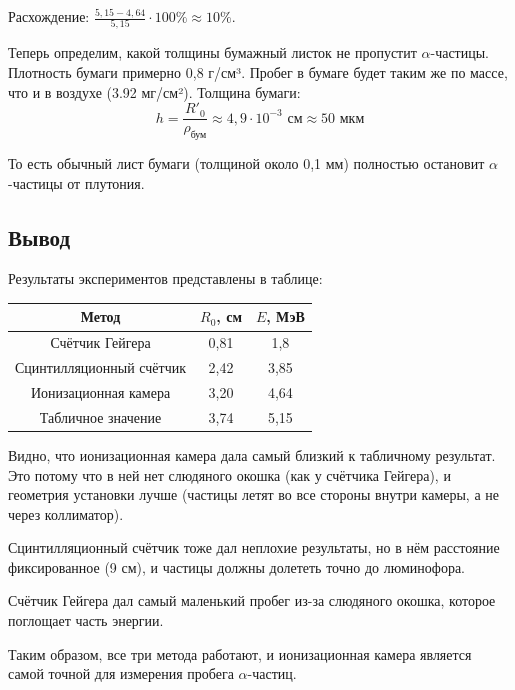 \documentclass[12pt, a4paper]{article}
\begin{document}
Расхождение: $\frac{5,15 - 4,64}{5,15} \cdot 100\% \approx 10\%$.

Теперь определим, какой толщины бумажный листок не пропустит $\alpha$-частицы. Плотность бумаги примерно 0,8 г/см³. Пробег в бумаге будет таким же по массе, что и в воздухе (3.92 мг/см²). Толщина бумаги:
\begin{equation}
    h = \frac{R'_0}{\rho_{\text{бум}}} \approx 4,9 \cdot 10^{-3} \text{ см} \approx 50 \text{ мкм}
\end{equation}

То есть обычный лист бумаги (толщиной около 0,1 мм) полностью остановит $\alpha$-частицы от плутония.

\subsection*{Вывод}

Результаты экспериментов представлены в таблице:

\begin{table}[H]
\centering
\begin{tabular}{|c|c|c|}
\hline
Метод & $R_0$, см & $E$, МэВ \\
\hline
Счётчик Гейгера & 0,81 & 1,8 \\
Сцинтилляционный счётчик & 2,42 & 3,85 \\
Ионизационная камера & 3,20 & 4,64 \\
Табличное значение & 3,74 & 5,15 \\
\hline
\end{tabular}
\end{table}

Видно, что ионизационная камера дала самый близкий к табличному результат. Это потому что в ней нет слюдяного окошка (как у счётчика Гейгера), и геометрия установки лучше (частицы летят во все стороны внутри камеры, а не через коллиматор).

Сцинтилляционный счётчик тоже дал неплохие результаты, но в нём расстояние фиксированное (9 см), и частицы должны долететь точно до люминофора.

Счётчик Гейгера дал самый маленький пробег из-за слюдяного окошка, которое поглощает часть энергии.

Таким образом, все три метода работают, и ионизационная камера является самой точной для измерения пробега $\alpha$-частиц.
\end{document}
